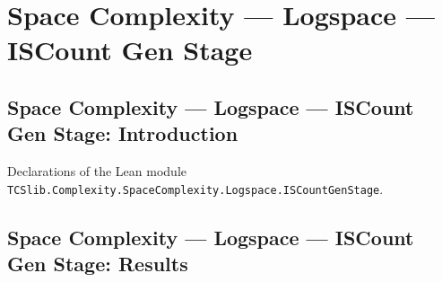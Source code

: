 \section{Space Complexity --- Logspace --- ISCount Gen Stage}
\subsection*{Space Complexity --- Logspace --- ISCount Gen Stage: Introduction}

Declarations of the Lean module \texttt{TCSlib.Complexity.SpaceComplexity.Logspace.ISCountGenStage}.

\subsection*{Space Complexity --- Logspace --- ISCount Gen Stage: Results}

